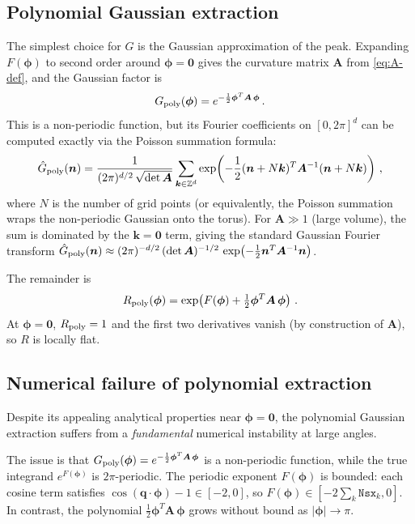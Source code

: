 \documentclass[11pt,a4paper]{article}
\newcommand{\bphi}{\bm{\phi}}
\newcommand{\bq}{\bm{q}}
\newcommand{\bA}{\bm{A}}
\begin{document}
\subsection{Polynomial Gaussian extraction}
\label{sec:poly-gaussian}

The simplest choice for $G$ is the Gaussian approximation of the peak.
Expanding $F(\bphi)$ to second order around $\bphi = \bm{0}$ gives the curvature matrix $\bA$ from \cref{eq:A-def}, and the Gaussian factor is
\begin{equation}\label{eq:gaussian-factor}
  G_{\rm poly}(\bphi) = e^{-\frac{1}{2}\bphi^T \bA\,\bphi}\,.
\end{equation}
This is a non-periodic function, but its Fourier coefficients on $[0, 2\pi]^d$ can be computed exactly via the Poisson summation formula:
\begin{equation}\label{eq:poisson-sum}
  \hat{G}_{\rm poly}(\bm{n}) = \frac{1}{(2\pi)^{d/2}\,\sqrt{\det \bA}}
  \sum_{\bm{k} \in \mathbb{Z}^d}
  \exp\!\left(-\frac{1}{2}(\bm{n} + N\bm{k})^T \bA^{-1} (\bm{n} + N\bm{k})\right)\,,
\end{equation}
where $N$ is the number of grid points (or equivalently, the Poisson summation wraps the non-periodic Gaussian onto the torus).
For $\bA \gg 1$ (large volume), the sum is dominated by the $\bm{k} = \bm{0}$ term, giving the standard Gaussian Fourier transform $\hat{G}_{\rm poly}(\bm{n}) \approx (2\pi)^{-d/2}\,(\det \bA)^{-1/2}\,\exp(-\frac{1}{2}\bm{n}^T \bA^{-1} \bm{n})$.

The remainder is
\begin{equation}\label{eq:remainder-poly}
  R_{\rm poly}(\bphi) = \exp\!\left(F(\bphi) + \tfrac{1}{2}\bphi^T \bA\,\bphi\right)\,.
\end{equation}
At $\bphi = \bm{0}$, $R_{\rm poly} = 1$ and the first two derivatives vanish (by construction of $\bA$), so $R$ is locally flat.

\subsection{Numerical failure of polynomial extraction}
\label{sec:poly-failure}

Despite its appealing analytical properties near $\bphi = \bm{0}$, the polynomial Gaussian extraction suffers from a \emph{fundamental} numerical instability at large angles.

The issue is that $G_{\rm poly}(\bphi) = e^{-\frac{1}{2}\bphi^T \bA\,\bphi}$ is a non-periodic function, while the true integrand $e^{F(\bphi)}$ is $2\pi$-periodic.
The periodic exponent $F(\bphi)$ is bounded: each cosine term satisfies $\cos(\bq \cdot \bphi) - 1 \in [-2, 0]$, so $F(\bphi) \in [-2\sum_k \texttt{Nsx}_k, 0]$.
In contrast, the polynomial $\frac{1}{2}\bphi^T \bA\,\bphi$ grows without bound as $|\bphi| \to \pi$.
\end{document}
